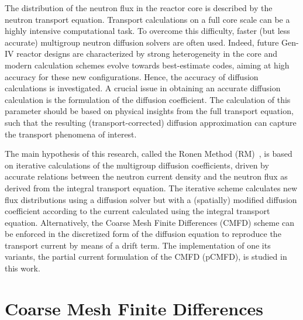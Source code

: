\documentclass[review,3p,onecolumn,sort&compress]{elsarticle}
\begin{document}
The distribution of the neutron flux in the reactor core is described by the neutron transport equation. Transport calculations on a full core scale can be a highly intensive computational task. To overcome this difficulty, faster (but less accurate) multigroup neutron diffusion solvers are often used. Indeed, future Gen-IV reactor designs are characterized by strong heterogeneity in the core and modern calculation schemes evolve towards best-estimate codes, aiming at high accuracy for these new configurations. Hence, the accuracy of diffusion calculations is investigated. A crucial issue in obtaining an accurate diffusion calculation is the formulation of the diffusion coefficient. The calculation of this parameter should be based on physical insights from the full transport equation, such that the resulting (transport-corrected) diffusion approximation can capture the transport phenomena of interest.

The main hypothesis of this research, called the Ronen Method (RM)~\cite{Ronen-2004,Tomatis-2011}, is based on iterative calculations of the multigroup diffusion coefficients, driven by accurate relations between the neutron current density and the neutron flux as derived from the integral transport equation. The iterative scheme calculates new flux distributions using a diffusion solver but with a (spatially) modified diffusion coefficient according to the current calculated using the integral transport equation. Alternatively, the Coarse Mesh Finite Differences (CMFD) scheme can be enforced in the discretized form of the diffusion equation to reproduce the transport current by means of a drift term. The implementation of one its variants, the partial current formulation of the CMFD (pCMFD), is studied in this work.
%

\section{Coarse Mesh Finite Differences}
\label{sec:CMFD-intro}
\end{document}
